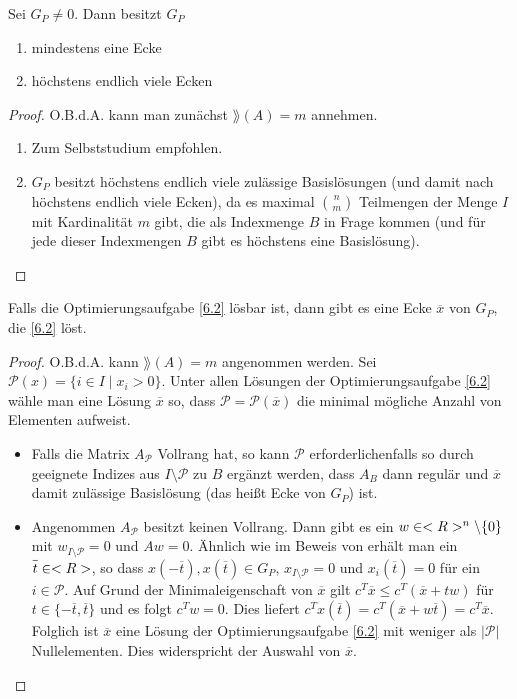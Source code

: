 \begin{proposition}
	Sei $G_P\neq 0$. Dann besitzt $G_P$
	\begin{enumerate}[label=(\alph*)]
		\item mindestens eine Ecke
		\item  höchstens endlich viele Ecken
	\end{enumerate}
\end{proposition}
\begin{proof}
	O.B.d.A. kann man zunächst $\rang(A)=m$ annehmen.
	\begin{enumerate}[label=(\alph*)]
		\item Zum Selbststudium empfohlen.
		\item $G_P$ besitzt höchstens endlich viele zulässige Basislösungen (und damit nach  höchstens endlich viele Ecken), da es maximal $\binom{n}{m}$ Teilmengen der Menge $I$ mit Kardinalität $m$ gibt, die als Indexmenge $B$ in Frage kommen (und für jede dieser Indexmengen $B$ gibt es höchstens eine Basislösung).
	\end{enumerate}
\end{proof}

\begin{proposition}
	Falls die Optimierungsaufgabe \cref{6.2} lösbar ist, dann gibt es eine Ecke $\overline{x}$ von $G_P$, die \cref{6.2} löst.
\end{proposition}
\begin{proof}
	O.B.d.A. kann $\rang(A)=m$ angenommen werden. Sei $\mathcal{P}(x) = \{i\in I\mid x_i>0\}$. Unter allen Lösungen der Optimierungsaufgabe \cref{6.2} wähle man eine Lösung $\overline{x}$ so, dass $\mathcal{P}=\mathcal{P}(\overline{x})$ die minimal mögliche Anzahl von Elementen aufweist. 
	\begin{itemize}
		\item Falls die Matrix $A_\mathcal{P}$ Vollrang hat, so kann $\mathcal{P}$ erforderlichenfalls so durch geeignete Indizes aus $I\setminus\mathcal{P}$ zu $B$ ergänzt werden, dass $A_B$ dann regulär und $\overline{x}$ damit zulässige Basislösung (das heißt Ecke von $G_P$) ist.
		\item Angenommen $A_\mathcal{P}$ besitzt keinen Vollrang. Dann gibt es ein $w\in<R>^n\backslash\{0\}$ mit $w_{I\setminus\mathcal{P}}=0$ und $Aw=0$. Ähnlich wie im Beweis von  erhält man ein $\overline{t}\in\real$, so dass $x(-\overline{t}),x(\overline{t})\in G_P$, $x_{I\setminus\mathcal{P}}=0$ und $x_i(\overline{t})=0$ für ein $i\in\mathcal{P}$. Auf Grund der Minimaleigenschaft von $\overline{x}$ gilt $c^T\overline{x}\le c^T(\overline{x}+tw)$ für $t\in\{-\overline{t},\overline{t}\}$ und es folgt $c^Tw=0$. Dies liefert $c^Tx(\overline{t})=c^T(\overline{x}+w\overline{t})=c^T\overline{x}$. Folglich ist $\overline{x}$ eine Lösung der Optimierungsaufgabe \cref{6.2} mit weniger als $\vert\mathcal{P}\vert$ Nullelementen. Dies widerspricht der Auswahl von $\overline{x}$.
	\end{itemize}
\end{proof}